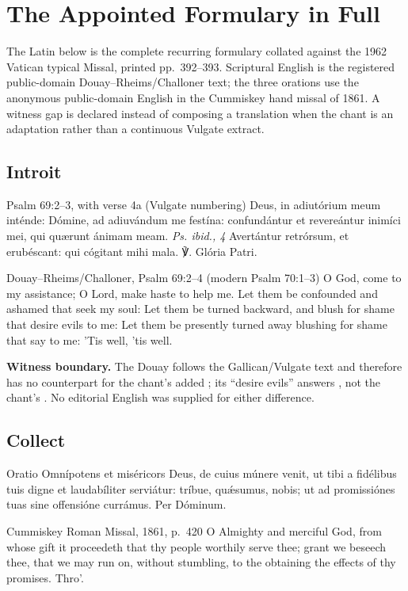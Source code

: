 \sectionguard
\section*{The Appointed Formulary in Full}

The Latin below is the complete recurring formulary collated against the 1962
Vatican typical Missal, printed pp.~392--393. Scriptural English is the
registered public-domain Douay--Rheims/Challoner text; the three orations use
the anonymous public-domain English in the Cummiskey hand missal of 1861. A
witness gap is declared instead of composing a translation when the chant is
an adaptation rather than a continuous Vulgate extract.

\elementguard
\subsection*{Introit }
\begin{appointedlatin}{Psalm 69:2--3, with verse 4a (Vulgate numbering)}
Deus, in adiutórium meum inténde: Dómine, ad adiuvándum me festína:
confundántur et revereántur inimíci mei, qui quærunt ánimam meam.
\emph{Ps. ibid., 4} Avertántur retrórsum, et erubéscant: qui cógitant mihi
mala. ℣. Glória Patri.
\end{appointedlatin}
\begin{namedtranslation}{Douay--Rheims/Challoner, Psalm 69:2--4 (modern Psalm 70:1--3)}
O God, come to my assistance; O Lord, make haste to help me. Let them be
confounded and ashamed that seek my soul: Let them be turned backward, and
blush for shame that desire evils to me: Let them be presently turned away
blushing for shame that say to me: 'Tis well, 'tis well.

\textbf{Witness boundary.} The Douay follows the Gallican/Vulgate text and
therefore has no counterpart for the chant's added ; its
``desire evils'' answers , not the chant's
. No editorial English was supplied for either
difference.
\end{namedtranslation}

\elementguard
\subsection*{Collect }
\begin{appointedlatin}{Oratio}
Omnípotens et miséricors Deus, de cuius múnere venit, ut tibi a fidélibus tuis
digne et laudabíliter serviátur: tríbue, quǽsumus, nobis; ut ad promissiónes
tuas sine offensióne currámus. Per Dóminum.
\end{appointedlatin}
\begin{namedtranslation}{Cummiskey Roman Missal, 1861, p.~420}
O Almighty and merciful God, from whose gift it proceedeth that thy people
worthily serve thee; grant we beseech thee, that we may run on, without
stumbling, to the obtaining the effects of thy promises. Thro'.
\end{namedtranslation}

